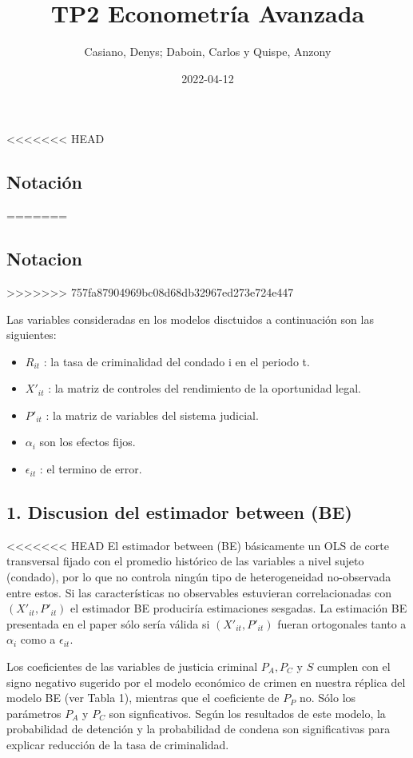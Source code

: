 \documentclass[
]{article}
\title{TP2 Econometría Avanzada}
\author{Casiano, Denys; Daboin, Carlos y Quispe, Anzony}
\date{2022-04-12}
\providecommand{\tightlist}{%
  \setlength{\itemsep}{0pt}\setlength{\parskip}{0pt}}
\begin{document}
\maketitle

<<<<<<< HEAD
\hypertarget{notaciuxf3n}{%
\subsection{Notación}\label{notaciuxf3n}}
=======
\hypertarget{notacion}{%
\subsection{Notacion}\label{notacion}}
>>>>>>> 757fa87904969bc08d68db32967ed273e724e447

Las variables consideradas en los modelos disctuidos a continuación son
las siguientes:

\begin{itemize}
\tightlist
\item
  \(R_{it}\) : la tasa de criminalidad del condado i en el periodo t.
\item
  \(X'_{it}\) : la matriz de controles del rendimiento de la oportunidad
  legal.
\item
  \(P'_{it}\) : la matriz de variables del sistema judicial.
\item
  \(\alpha_{i}\) son los efectos fijos.
\item
  \(\epsilon_{it}\) : el termino de error.
\end{itemize}

\hypertarget{discusion-del-estimador-between-be}{%
\subsection{1. Discusion del estimador between
(BE)}\label{discusion-del-estimador-between-be}}

<<<<<<< HEAD
El estimador between (BE) básicamente un OLS de corte transversal fijado
con el promedio histórico de las variables a nivel sujeto (condado), por
lo que no controla ningún tipo de heterogeneidad no-observada entre
estos. Si las características no observables estuvieran correlacionadas
con \((X'_{it},P'_{it})\) el estimador BE produciría estimaciones
sesgadas. La estimación BE presentada en el paper sólo sería válida si
\((X'_{it},P'_{it})\) fueran ortogonales tanto a \(\alpha_i\) como a
\(\epsilon_{it}\).

Los coeficientes de las variables de justicia criminal \(P_A, P_C\) y
\(S\) cumplen con el signo negativo sugerido por el modelo económico de
crimen en nuestra réplica del modelo BE (ver Tabla 1), mientras que el
coeficiente de \(P_P\) no. Sólo los parámetros \(P_A\) y \(P_C\) son
signficativos. Según los resultados de este modelo, la probabilidad de
detención y la probabilidad de condena son significativas para explicar
reducción de la tasa de criminalidad.
\end{document}
